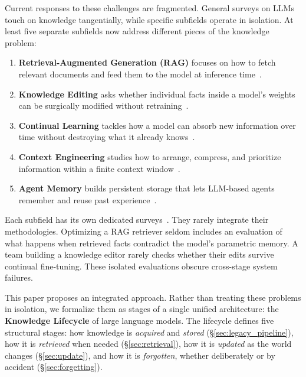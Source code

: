 \documentclass{article}
\begin{document}
Current responses to these challenges are fragmented. General surveys on LLMs~\citep{zhao2023surveyllm, wang2024agents} touch on knowledge tangentially, while specific subfields operate in isolation. At least five separate subfields now address different pieces of the knowledge problem:

\begin{enumerate}[leftmargin=*]
  \item \textbf{Retrieval-Augmented Generation (RAG)} focuses on how to fetch relevant documents and feed them to the model at inference time~\citep{lewis2020rag, guu2020realm, gao2023ragsurvey}.
  \item \textbf{Knowledge Editing} asks whether individual facts inside a model's weights can be surgically modified without retraining~\citep{meng2022rome, meng2023memit, yao2023editingsurvey}.
  \item \textbf{Continual Learning} tackles how a model can absorb new information over time without destroying what it already knows~\citep{kirkpatrick2017ewc, ke2023continual, wu2024continual}.
  \item \textbf{Context Engineering} studies how to arrange, compress, and prioritize information within a finite context window~\citep{liu2024lost}.
  \item \textbf{Agent Memory} builds persistent storage that lets LLM-based agents remember and reuse past experience~\citep{park2023generative, packer2023memgpt, hu2025agentmemory}.
\end{enumerate}

Each subfield has its own dedicated surveys~\citep{gao2023ragsurvey, mialon2023augmented, hu2025agentmemory, wu2025humanmemory}. They rarely integrate their methodologies. Optimizing a RAG retriever seldom includes an evaluation of what happens when retrieved facts contradict the model's parametric memory. A team building a knowledge editor rarely checks whether their edits survive continual fine-tuning. These isolated evaluations obscure cross-stage system failures.

This paper proposes an integrated approach. Rather than treating these problems in isolation, we formalize them as stages of a single unified architecture: the \textbf{Knowledge Lifecycle} of large language models. The lifecycle defines five structural stages: how knowledge is \textit{acquired} and \textit{stored} (\S\ref{sec:legacy_pipeline}), how it is \textit{retrieved} when needed (\S\ref{sec:retrieval}), how it is \textit{updated} as the world changes (\S\ref{sec:update}), and how it is \textit{forgotten}, whether deliberately or by accident (\S\ref{sec:forgetting}).
\end{document}
